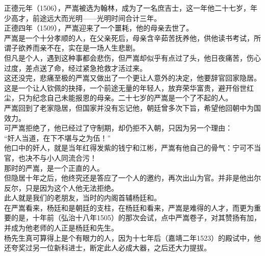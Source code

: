 \begin{multicols}{\theparacolNo}
正德元年（1506），严嵩被选为翰林，成为了一名庶吉士，这一年他二十七岁，年少高才，前途远大而光明——光明时间合计三年。\\

正德四年（1509），严嵩迎来了一个噩耗，他的母亲去世了。\\

严嵩是一个十分孝顺的人，在父亲死后，母亲含辛茹苦抚养他，供他读书考试，所谓子欲养而亲不在，实在是一场人生悲剧。\\

但凡是个人，遇到这种事都会悲伤，但严嵩却似乎有点过了头，他日夜痛苦，伤心过度，差点送了命，经过紧急抢救才活过来。\\

这还没完，悲痛至极的严嵩又做出了一个更让人意外的决定，他要辞官回家隐居。\\

这是一个让人钦佩的抉择，一个前途无量的年轻人，放弃荣华富贵，避开俗世红尘，只为纪念自己未能报恩的母亲。二十七岁的严嵩是一个了不起的人。\\

严嵩回到了老家隐居，但国家并没有忘记他，朝廷曾多次下旨，希望他回朝中为国效力。\\

可严嵩拒绝了，他已经过了守制期，却仍拒不入朝，只因为另一个理由：\\

“奸人当道，在下不堪与之为伍！”\\

他口中的奸人，就是当年红得发紫的钱宁和江彬，严嵩有他自己的骨气：宁可不当官，也决不与小人同流合污！\\

那时的严嵩，是一个正直的人。\\

但隐居十年之后，他终究还是答应了一个人的邀约，再次出山为官。并非是他出尔反尔，只是因为这个人他无法拒绝。\\

此人就是我们的老朋友，当时的内阁首辅杨廷和。\\

在严嵩看来，杨廷和是朝廷的支柱，在杨廷和看来，严嵩是难得的人才，而更为重要的是，十年前（弘治十八年1505）的那次会试，点中严嵩卷子，对其赞扬有加，并成为他老师的人正是杨廷和先生。\\

杨先生真可算得上是个有眼力的人，因为十七年后（嘉靖二年1523）的殿试中，他还夸奖过另一位新科进士，断定此人必成大器，之后还大力提拔。\\


\end{multicols}
